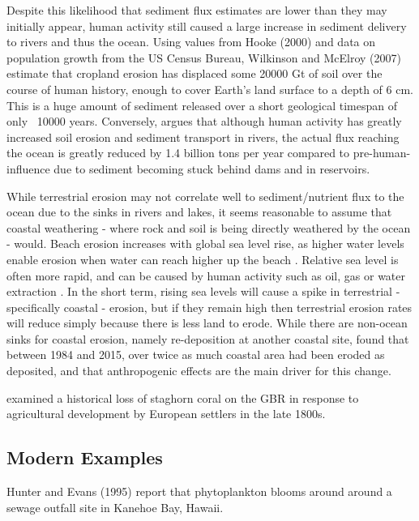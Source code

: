 \documentclass[11pt,a4paper]{article}
\begin{document}

Despite this likelihood that sediment flux estimates are lower than they may initially appear, human activity still caused a large increase in sediment delivery to rivers and thus the ocean. Using values from Hooke (2000) and data on population growth from the US Census Bureau, Wilkinson and McElroy (2007) estimate that cropland erosion has displaced some 20000 Gt of soil over the course of human history, enough to cover Earth's land surface to a depth of 6 cm. This is a huge amount of sediment released over a short geological timespan of only ~10000 years. Conversely, \cite{Syvitski2005} argues that although human activity has greatly increased soil erosion and sediment transport in rivers, the actual flux reaching the ocean is greatly reduced by 1.4 billion tons per year compared to pre-human-influence due to sediment becoming stuck behind dams and in reservoirs. 

While terrestrial erosion may not correlate well to sediment/nutrient flux to the ocean due to the sinks in rivers and lakes, it seems reasonable to assume that coastal weathering - where rock and soil is being directly weathered by the ocean - would. Beach erosion increases with global sea level rise, as higher water levels enable erosion when water can reach higher up the beach \citep{Zhang2004}. Relative sea level is often more rapid, and can be caused by human activity such as oil, gas or water extraction \citep{Williams2018}. 
In the short term, rising sea levels will cause a spike in terrestrial - specifically coastal - erosion, but if they remain high then terrestrial erosion rates will reduce simply because there is less land to erode. While there are non-ocean sinks for coastal erosion, namely re-deposition at another coastal site, \cite{Mentaschi2018} found that between 1984 and 2015, over twice as much coastal area had been eroded as deposited, and that anthropogenic effects are the main driver for this change.


\cite{Roff2013} examined a historical loss of staghorn coral on the GBR in response to agricultural development by European settlers in the late 1800s. 


\subsection{Modern Examples}

Hunter and Evans (1995) report that phytoplankton blooms around around a sewage outfall site in Kanehoe Bay, Hawaii.
\end{document}
